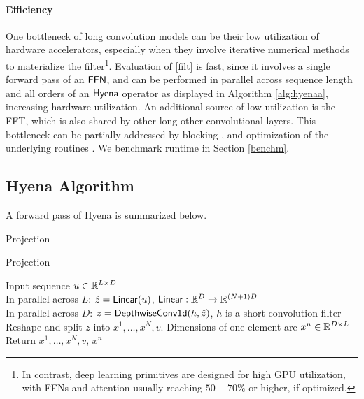 \paragraph{Efficiency}
%
One bottleneck of long convolution models can be their low utilization of hardware accelerators, especially when they involve iterative numerical methods to materialize the filter\footnote{In contrast, deep learning primitives are designed for high GPU utilization, with {\sf FFNs} and attention usually reaching $50-70\%$ or higher, if optimized.}. Evaluation of \ref{filt} is fast, since it involves a single forward pass of an {$\sf FFN$}, and can be performed in parallel across sequence length and all orders of an ${\sf Hyena}$ operator as displayed in Algorithm \ref{alg:hyenaa}, increasing hardware utilization. An additional source of low utilization is the FFT, which is also shared by other long other convolutional layers. This bottleneck can be partially addressed by blocking \citep{selesnick2017fast}, and optimization of the underlying routines \citep{dao2022hungry}. We benchmark runtime in Section \ref{benchm}.
%

\subsection{{\sf Hyena} Algorithm}
%

A forward pass of {\sf Hyena} is summarized below. 

\setcounter{algorithm}{-1}
\begin{algorithm}[h]
    \caption{{\sf Projection}}\label{alg:hyenaa}
    \caption{{\sf Projection}}
    \begin{algorithmic}
    \REQUIRE Input sequence $u \in \mathbb{R}^{L \times D}$ \\ 
     In parallel across $L$: $\hat{z} = {\sf Linear}(u)$, ${\sf Linear}:\mathbb{R}^{D} \rightarrow \mathbb{R}^{(N+1)D}$ \\
     In parallel across $D$: $z = {\sf DepthwiseConv1d}(h, \hat{z} )$, $h$ is a short convolution filter \\
     Reshape and split $z$ into $x^1, \dots, x^N, v$. Dimensions of one element are $x^n \in \mathbb{R}^{D \times L}$\\ 
    \STATE Return $x^1, \dots, x^N, v$, $x^n$
    \end{algorithmic}
\end{algorithm}

